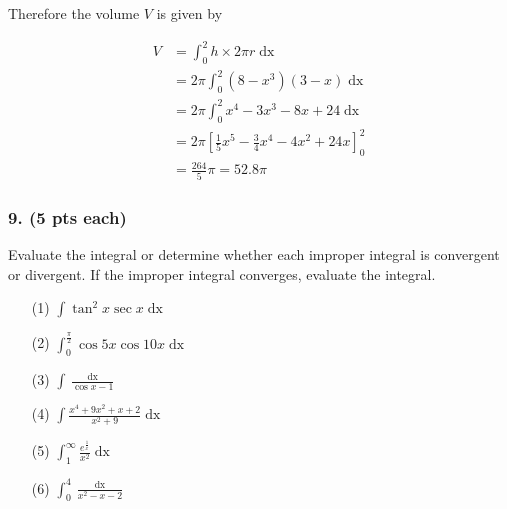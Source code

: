 Therefore the volume $V$ is given by

\begin{align*}
V &= \int_0^2 h\times 2\pi r \mathop{dx}\\
&= 2\pi\int_0^2 \left(8-x^3\right)\left(3-x\right) \mathop{dx}\\
&= 2\pi\int_0^2 x^4-3x^3-8x+24 \mathop{dx}\\
&= 2\pi\left[\frac{1}{5}x^5-\frac{3}{4}x^4-4x^2+24x\right]_0^2\\
&= \frac{264}{5}\pi = 52.8\pi
\end{align*}

\subsubsection{9. (5 pts each)} Evaluate the integral or determine whether each improper integral is convergent or divergent. If the improper integral converges, evaluate the integral.
\begin{itemize}
	\item [(1)] $\displaystyle \int \tan^2 x \sec x \mathop{dx}$
	\item [(2)] $\displaystyle \int_0^\frac{\pi}{2} \cos 5x \cos 10x \mathop{dx}$
	\item [(3)] $\displaystyle \int \frac{\mathop{dx}}{\cos x - 1}$
	\item [(4)] $\displaystyle \int \frac{x^4+9x^2+x+2}{x^2+9}\mathop{dx}$
	\item [(5)] $\displaystyle \int_1^{\infty} \frac{e^\frac{1}{x}}{x^2}\mathop{dx}$
	\item [(6)] $\displaystyle \int_0^4 \frac{\mathop{dx}}{x^2-x-2}$
\end{itemize}

